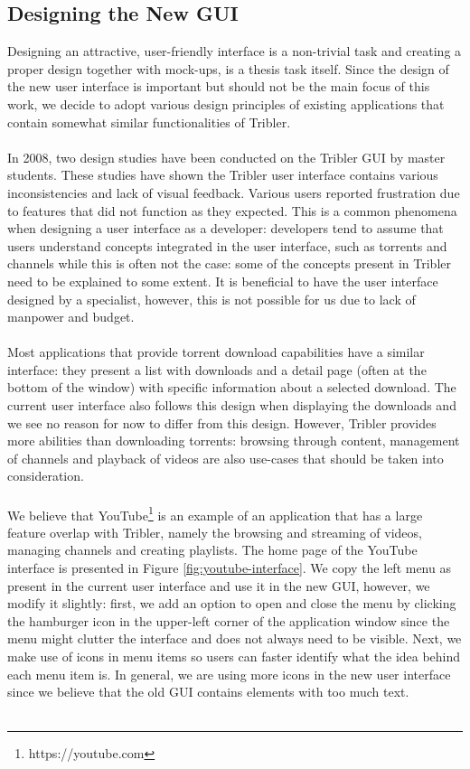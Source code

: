 \subsection{Designing the New GUI}
Designing an attractive, user-friendly interface is a non-trivial task and creating a proper design together with mock-ups, is a thesis task itself. Since the design of the new user interface is important but should not be the main focus of this work, we decide to adopt various design principles of existing applications that contain somewhat similar functionalities of Tribler.\\\\
In 2008, two design studies have been conducted on the Tribler GUI by master students\cite{triblerusabilityc2}\cite{triblerusabilityc4}. These studies have shown the Tribler user interface contains various inconsistencies and lack of visual feedback. Various users reported frustration due to features that did not function as they expected. This is a common phenomena when designing a user interface as a developer: developers tend to assume that users understand concepts integrated in the user interface, such as torrents and channels while this is often not the case: some of the concepts present in Tribler need to be explained to some extent. It is beneficial to have the user interface designed by a specialist, however, this is not possible for us due to lack of manpower and budget.\\\\
Most applications that provide torrent download capabilities have a similar interface: they present a list with downloads and a detail page (often at the bottom of the window) with specific information about a selected download. The current user interface also follows this design when displaying the downloads and we see no reason for now to differ from this design. However, Tribler provides more abilities than downloading torrents: browsing through content, management of channels and playback of videos are also use-cases that should be taken into consideration.\\\\
We believe that YouTube\footnote{https://youtube.com} is an example of an application that has a large feature overlap with Tribler, namely the browsing and streaming of videos, managing channels and creating playlists. The home page of the YouTube interface is presented in Figure \ref{fig:youtube-interface}. We copy the left menu as present in the current user interface and use it in the new GUI, however, we modify it slightly: first, we add an option to open and close the menu by clicking the hamburger icon in the upper-left corner of the application window since the menu might clutter the interface and does not always need to be visible. Next, we make use of icons in menu items so users can faster identify what the idea behind each menu item is. In general, we are using more icons in the new user interface since we believe that the old GUI contains elements with too much text.\\\\
